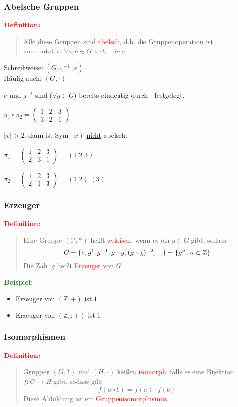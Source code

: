 \documentclass{article}
\newcommand{\smsp}{\phantom{\hspace{3px}}}
\newcommand{\red}[1]{\textcolor{red}{#1}}
\newcommand{\green}[1]{\textcolor{green}{#1}}
\newcommand{\ex}{\green{\textbf{Beispiel: }}}
\newcommand{\de}[1]{\red{\textbf{Definition: }}\begin{quote}#1\end{quote}}
\newcommand{\Z}{\mathbb{Z}}
\newcommand{\vst}{\smsp \vline \smsp}
\begin{document}
\subsubsection{Abelsche Gruppen}
\de{
    Alle diese Gruppen sind \red{abelsch}, d.h. die Gruppenoperation ist kommutativ: $\forall a,b \in G: a \cdot b = b \cdot a$
}

Schreibweise: $(G, \cdot, ^{-1}, e)$\\
Häufig auch: $(G, \cdot)$

$e$ und $g^{-1}$ sind ($\forall g \in G$) bereits eindeutig durch $\cdot$ festgelegt.

$\pi_1 \circ \pi_2 = \begin{pmatrix}
    1 & 2 & 3\\
    3 & 2 & 1
\end{pmatrix}$


$|x| > 2$, dann ist Sym$(x)$ \underline{nicht} abelsch:

$\pi_1 = \begin{pmatrix}
    1 & 2 & 3\\
    2 & 3 & 1
\end{pmatrix}
= (1 \; 2 \; 3)$

$\pi_2 = \begin{pmatrix}
    1 & 2 & 3\\
    2 & 1 & 3
\end{pmatrix}
= (1 \; 2) \; (3)$

\subsubsection{Erzeuger}
\de{
    Eine Gruppe $(G; *)$ heißt \red{zyklisch}, wenn es ein $g \in G$ gibt, sodass
    $$G = \{e, g^1, g^{-1}, g \circ g, (g \circ g)^{-2}, ...\} = \{g^n \vst n \in \Z\}$$
    Die Zahl $g$ heißt \red{Erzeuger} von $G$.
}

\ex \begin{itemize}
    \item Erzeuger von $(\Z; +)$ ist $1$
    \item Erzeuger von $(\Z_n; +)$ ist $1$
\end{itemize}

\subsubsection{Isomorphismen}
\de{
    Gruppen $(G, *)$ und $(H, \cdot)$ heißen \red{isomorph}, falls es eine Bijektion $f: G \to H$ gibt, sodass gilt:
    $$f(a \circ b) = f(a) \cdot f(b)$$
    Diese Abbildung ist ein \red{Gruppenisomorphismus}.
}
\end{document}
